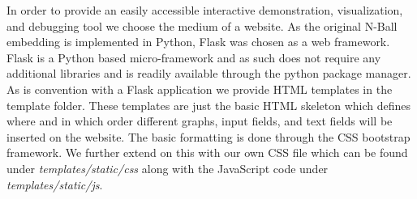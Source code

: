 \label{sec::flask}
In order to provide an easily accessible interactive demonstration, visualization, and debugging tool we choose the medium of a website. As the original N-Ball embedding is implemented in Python, Flask was chosen as a web framework.  Flask is a Python based micro-framework and as such does not require any additional libraries and is readily available through the python package manager. 
As is convention with a Flask application we provide HTML templates in the template folder. These templates are just the basic HTML skeleton which defines where and in which order different graphs, input fields, and text fields will be inserted on the website. The basic formatting is done through the CSS bootstrap framework. We further extend on this with our own CSS file which can be found under \textit{templates/static/css} along with the JavaScript code under \textit{templates/static/js}. 


